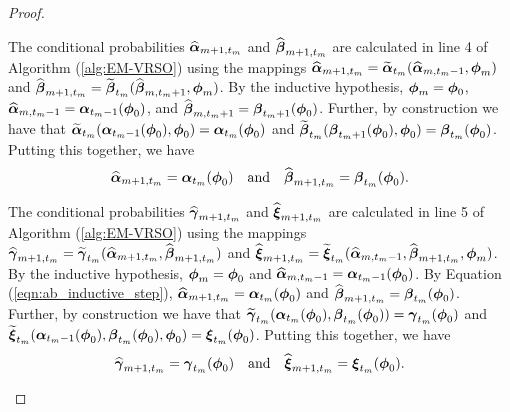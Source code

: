 \begin{proof}
\begin{enumerate}
        The conditional probabilities $\widehat {\boldsymbol{\alpha}}_{m+1,t_m}$ and $\widehat {\boldsymbol{\beta}}_{m+1,t_m}$ are calculated in line 4 of Algorithm (\ref{alg:EM-VRSO}) using the mappings $\widehat {\boldsymbol{\alpha}}_{m+1,t_m} = \widetilde {\boldsymbol{\alpha}}_{t_m}(\widehat {\boldsymbol{\alpha}}_{m,t_m-1},\boldsymbol{\phi}_m)$ and $\widehat {\boldsymbol{\beta}}_{m+1,t_m} = \widetilde {\boldsymbol{\beta}}_{t_m}(\widehat {\boldsymbol{\beta}}_{m,t_m+1} ,\boldsymbol{\phi}_m)$. By the inductive hypothesis, $\boldsymbol{\phi}_m = \boldsymbol{\phi}_0$, $\widehat {\boldsymbol{\alpha}}_{m,t_m-1} = \boldsymbol{\alpha}_{t_m-1}(\boldsymbol{\phi}_0)$, and $\widehat {\boldsymbol{\beta}}_{m,t_m+1} = \boldsymbol{\beta}_{t_m+1}(\boldsymbol{\phi}_0)$. Further, by construction we have that $\widetilde {\boldsymbol{\alpha}}_{t_m}(\boldsymbol{\alpha}_{t_m-1}(\boldsymbol{\phi}_0),\boldsymbol{\phi}_0) = \boldsymbol{\alpha}_{t_m}(\boldsymbol{\phi}_0)$ and $\widetilde {\boldsymbol{\beta}}_{t_m}(\boldsymbol{\beta}_{t_m+1}(\boldsymbol{\phi}_0),\boldsymbol{\phi}_0) = \boldsymbol{\beta}_{t_m}(\boldsymbol{\phi}_0)$. Putting this together, we have
        \begin{equation}
            \widehat {\boldsymbol{\alpha}}_{m+1,t_m} = \boldsymbol{\alpha}_{t_m}(\boldsymbol{\phi}_0) \quad \text{and} \quad \widehat {\boldsymbol{\beta}}_{m+1,t_m} = \boldsymbol{\beta}_{t_m}(\boldsymbol{\phi}_0).
            \label{eqn:ab_inductive_step}
        \end{equation}

        The conditional probabilities $\widehat {\boldsymbol{\gamma}}_{m+1,t_m}$ and $\widehat {\boldsymbol{\xi}}_{m+1,t_m}$ are calculated in line 5 of Algorithm (\ref{alg:EM-VRSO}) using the mappings $\widehat {\boldsymbol{\gamma}}_{m+1,t_m} = \widetilde {\boldsymbol{\gamma}}_{t_m}(\widehat {\boldsymbol{\alpha}}_{m+1,t_m},\widehat {\boldsymbol{\beta}}_{m+1,t_m})$ and $\widehat {\boldsymbol{\xi}}_{m+1,t_m} = \widetilde {\boldsymbol{\xi}}_{t_m}(\widehat {\boldsymbol{\alpha}}_{m,t_m-1} , \widehat {\boldsymbol{\beta}}_{m+1,t_m}  ,\boldsymbol{\phi}_m)$. By the inductive hypothesis, $\boldsymbol{\phi}_m = \boldsymbol{\phi}_0$ and $\widehat {\boldsymbol{\alpha}}_{m,t_m-1} = \boldsymbol{\alpha}_{t_m-1}(\boldsymbol{\phi}_0)$. By Equation (\ref{eqn:ab_inductive_step}), $\widehat {\boldsymbol{\alpha}}_{m+1,t_m} = \boldsymbol{\alpha}_{t_m}(\boldsymbol{\phi}_0)$ and $\widehat {\boldsymbol{\beta}}_{m+1,t_m} = \boldsymbol{\beta}_{t_m}(\boldsymbol{\phi}_0)$. Further, by construction we have that $\widetilde {\boldsymbol{\gamma}}_{t_m}(\boldsymbol{\alpha}_{t_m}(\boldsymbol{\phi}_0),\boldsymbol{\beta}_{t_m}(\boldsymbol{\phi}_0)) = \boldsymbol{\gamma}_{t_m}(\boldsymbol{\phi}_0)$ and $\widetilde {\boldsymbol{\xi}}_{t_m}(\boldsymbol{\alpha}_{t_m-1}(\boldsymbol{\phi}_0),\boldsymbol{\beta}_{t_m}(\boldsymbol{\phi}_0),\boldsymbol{\phi}_0) = \boldsymbol{\xi}_{t_m}(\boldsymbol{\phi}_0)$. Putting this together, we have
        \begin{equation}
            \widehat {\boldsymbol{\gamma}}_{m+1,t_m} = \boldsymbol{\gamma}_{t_m}(\boldsymbol{\phi}_0) \quad \text{and} \quad \widehat {\boldsymbol{\xi}}_{m+1,t_m} = \boldsymbol{\xi}_{t_m}(\boldsymbol{\phi}_0).
        \end{equation}
        

\end{enumerate}
\end{proof}
